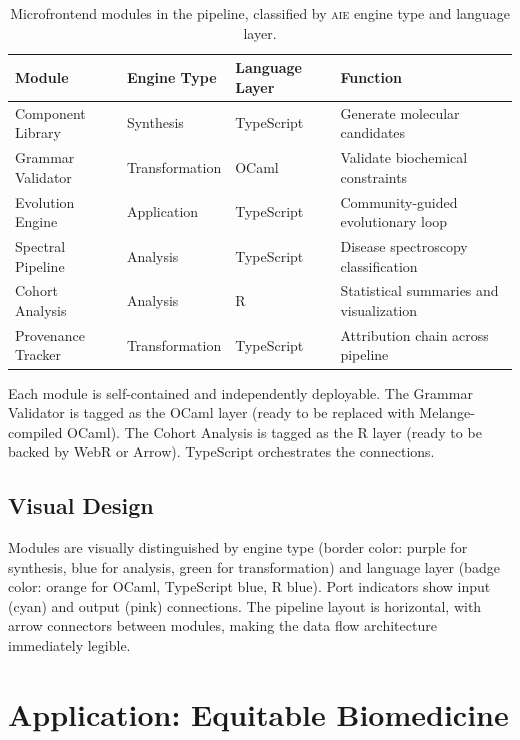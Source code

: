 \documentclass[11pt,letterpaper]{article}
\newcommand{\aie}{\textsc{aie}}
\begin{document}
\begin{table}[H]
\centering
\small
\begin{tabularx}{\textwidth}{llll}
\toprule
\textbf{Module} & \textbf{Engine Type} & \textbf{Language Layer} & \textbf{Function} \\
\midrule
Component Library & Synthesis & TypeScript & Generate molecular candidates \\
Grammar Validator & Transformation & OCaml & Validate biochemical constraints \\
Evolution Engine & Application & TypeScript & Community-guided evolutionary loop \\
Spectral Pipeline & Analysis & TypeScript & Disease spectroscopy classification \\
Cohort Analysis & Analysis & R & Statistical summaries and visualization \\
Provenance Tracker & Transformation & TypeScript & Attribution chain across pipeline \\
\bottomrule
\end{tabularx}
\caption{Microfrontend modules in the pipeline, classified by \aie{} engine type and language layer.}
\label{tab:modules}
\end{table}

Each module is self-contained and independently deployable. The Grammar Validator is tagged as the OCaml layer (ready to be replaced with Melange-compiled OCaml). The Cohort Analysis is tagged as the R layer (ready to be backed by WebR or Arrow). TypeScript orchestrates the connections.

\subsection{Visual Design}

Modules are visually distinguished by engine type (border color: purple for synthesis, blue for analysis, green for transformation) and language layer (badge color: orange for OCaml, TypeScript blue, R blue). Port indicators show input (cyan) and output (pink) connections. The pipeline layout is horizontal, with arrow connectors between modules, making the data flow architecture immediately legible.

\section{Application: Equitable Biomedicine}
\label{sec:biomedicine}
\end{document}
